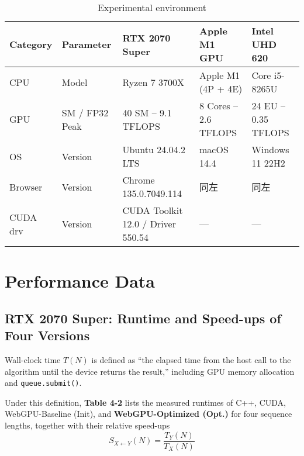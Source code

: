\documentclass[PhD]{PHlab-thesis}
\begin{document}
\begin{table}[htbp]
  \centering
  \caption{Experimental environment}
  \label{tab:exp_env}

  \setlength{\tabcolsep}{8pt}         %
  \renewcommand{\arraystretch}{1.4}   %

  \begin{tabularx}{\textwidth}{@{}lX X X X@{}}
    \toprule
    Category & Parameter & RTX 2070 Super & Apple M1 GPU & Intel UHD 620 \\
    \midrule
    CPU      & Model                 & Ryzen 7 3700X        & Apple M1 (4P + 4E) & Core i5-8265U \\
    GPU      & SM / FP32 Peak        & 40 SM – 9.1 TFLOPS   & 8 Cores – 2.6 TFLOPS & 24 EU – 0.35 TFLOPS \\
    OS       & Version               & Ubuntu 24.04.2 LTS   & macOS 14.4           & Windows 11 22H2 \\
    Browser  & Version               & Chrome 135.0.7049.114 & 同左                & 同左 \\
    CUDA drv & Version               & CUDA Toolkit 12.0 / Driver 550.54 & — & — \\
    \bottomrule
  \end{tabularx}
\end{table}



\section{Performance Data}
\subsection{RTX 2070 Super: Runtime and Speed-ups of Four Versions}
Wall-clock time $T(N)$ is defined as ``the elapsed time from the host call to the algorithm until the device returns the result,'' including GPU memory allocation and \texttt{queue.submit()}.

Under this definition, \textbf{Table 4-2} lists the measured runtimes of C++, CUDA, WebGPU-Baseline (Init), and \textbf{WebGPU-Optimized (Opt.)} for four sequence lengths, together with their relative speed-ups
\[
S_{X \leftarrow Y}(N) = \frac{T_Y(N)}{T_X(N)}
\]
\end{document}
